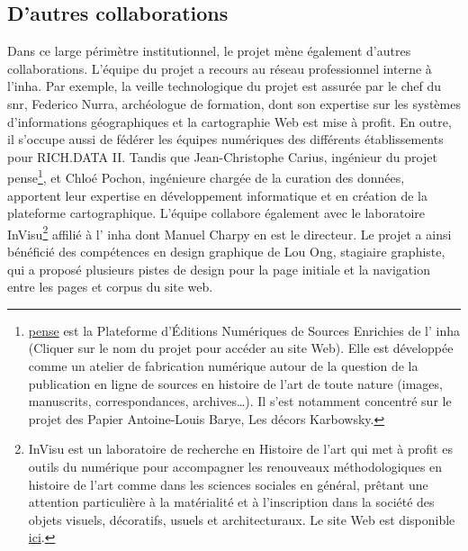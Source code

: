 \subsection{D'autres collaborations}
Dans ce large périmètre institutionnel, le projet mène également d'autres collaborations. L'équipe du projet a recours au réseau professionnel interne à l'\acrshort{inha}. Par exemple, la veille technologique du projet est assurée par le chef du \acrshort{snr}, Federico Nurra, archéologue de formation, dont son expertise sur les systèmes d'informations géographiques et la cartographie Web est mise à profit. En outre, il s'occupe aussi de fédérer les équipes numériques des différents établissements pour RICH.DATA II. Tandis que Jean-Christophe Carius, ingénieur du projet \acrlong{pense}\footnote{\href{https://pense.inha.fr/}{\acrshort{pense}} est la Plateforme d'Éditions Numériques de Sources Enrichies de l' \acrshort{inha} (Cliquer sur le nom du projet pour accéder au site Web). Elle est développée comme un atelier de fabrication numérique autour de la question de la publication en ligne de sources en histoire de l'art de toute nature (images, manuscrits, correspondances, archives…). Il s'est notamment concentré sur le projet des Papier Antoine-Louis Barye, Les décors Karbowsky.}, et Chloé Pochon, ingénieure chargée de la curation des données, apportent leur expertise en développement informatique et en création de la plateforme cartographique.
L'équipe collabore également avec le laboratoire InVisu\footnote{InVisu est un laboratoire de recherche en Histoire de l'art qui met à profit es outils du numérique pour accompagner les renouveaux méthodologiques en histoire de l'art comme dans les sciences sociales en général, prêtant une attention particulière à la matérialité et à l'inscription dans la société des objets visuels, décoratifs, usuels et architecturaux. Le site Web est disponible \href{https://invisu.cnrs.fr/}{ici}.} affilié à l' \acrshort{inha} dont Manuel Charpy en est le directeur. Le projet a ainsi bénéficié des compétences en design graphique de Lou Ong, stagiaire graphiste, qui a proposé plusieurs pistes de design pour la page initiale et la navigation entre les pages et corpus du site web. 

